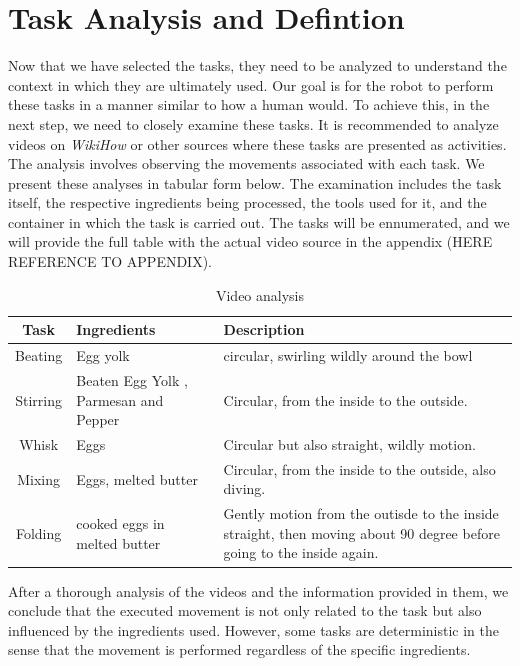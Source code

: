 \section{Task Analysis and Defintion}
Now that we have selected the tasks, they need to be analyzed to understand the context in which they are ultimately used. 
Our goal is for the robot to perform these tasks in a manner similar to how a human would. 
To achieve this, in the next step, we need to closely examine these tasks. 
It is recommended to analyze videos on \textit{WikiHow} \cite{wikihow} or other sources where these tasks are presented as activities. 
The analysis involves observing the movements associated with each task. 
We present these analyses in tabular form below. The examination includes the task itself, the respective ingredients being processed, the tools used for it, and the container in which the task is carried out.
The tasks will be ennumerated, and we will provide the full table with the actual video source in the appendix (HERE REFERENCE TO APPENDIX).
    \begin{table}[H]
    \centering
    \begin{tabular}{|c|p{}|p{}|}
        \hline
        \textbf{Task} &  \textbf{Ingredients} & \textbf{Description} \\
        \hline
        Beating &  Egg yolk & circular, swirling wildly around the bowl \\
        \hline
        Stirring & Beaten Egg Yolk , Parmesan and Pepper  & Circular, from the inside to the outside. \\
        \hline
        Whisk & Eggs  & Circular but also straight, wildly motion. \\
        \hline
        Mixing &  Eggs, melted butter & Circular, from the inside to the outside, also diving. \\
        \hline
        Folding & cooked eggs in melted butter & Gently motion from the outisde to the inside straight, then moving about 90 degree before going to the inside again. \\
        \hline
      \end{tabular}
    \caption{Video analysis}
    \label{tab:videoanalysis}
  \end{table}


After a thorough analysis of the videos and the information provided in them, we conclude that the executed movement is not only related to the task but also influenced by the ingredients used. However, some tasks are deterministic in the sense that the movement is performed regardless of the specific ingredients.

